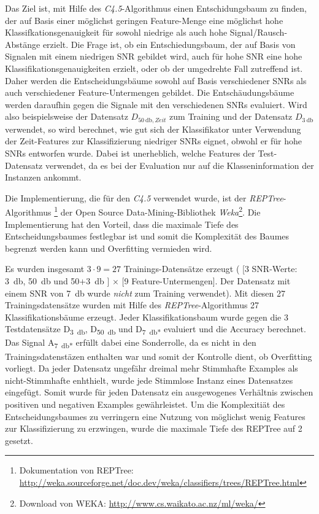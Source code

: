 Das Ziel ist, mit Hilfe des \emph{C4.5}-Algorithmus einen Entschidungsbaum zu finden, der auf Basis einer möglichst geringen Feature-Menge eine möglichst hohe Klassifkationsgenauigkeit für sowohl niedrige als auch hohe Signal/Rausch-Abstänge erzielt. Die Frage ist, ob ein Entschiedungsbaum, der auf Basis von Signalen mit einem niedrigen SNR gebildet wird, auch für hohe SNR eine hohe Klassifikationsgenauigkeiten erzielt, oder ob der umgedrehte Fall zutreffend ist. Daher werden die Entscheidungsbäume sowohl auf Basis verschiedener SNRs als auch verschiedener Feature-Untermengen gebildet. Die Entschäudungsbäume werden daraufhin gegen die Signale mit den verschiedenen SNRs evaluiert. Wird also beispielsweise der Datensatz $D_{\SI{50}{\decibel},Zeit}$ zum Training und der Datensatz $D_{\SI{3}{\decibel}}$ verwendet, so wird berechnet, wie gut sich der Klassifikator unter Verwendung der Zeit-Features zur Klassifizierung niedriger SNRs eignet, obwohl er für hohe SNRs entworfen wurde. Dabei ist unerheblich, welche Features der Test-Datensatz verwendet, da es bei der Evaluation nur auf die Klasseninformation der Instanzen ankommt.

Die Implementierung, die für den \emph{C4.5} verwendet wurde, ist der \emph{REPTree}-Algorithmus \footnote{Dokumentation von REPTree: \url{http://weka.sourceforge.net/doc.dev/weka/classifiers/trees/REPTree.html}} der Open Source Data-Mining-Bibliothek \emph{Weka}\footnote{Download von WEKA: \url{http://www.cs.waikato.ac.nz/ml/weka/}}. Die Implementierung hat den Vorteil, dass die maximale Tiefe des Entscheidungsbaumes festlegbar ist und somit die Komplexität des Baumes begrenzt werden kann und Overfitting vermieden wird.

Es wurden insgesamt $3 \cdot 9 = 27$ Trainings-Datensätze erzeugt ( [3 SNR-Werte: \SI{3}{\decibel}, \SI{50}{\decibel} und 50+\SI{3}{\decibel} ] $\times$ [9 Feature-Untermengen]. Der Datensatz mit einem SNR von \SI{7}{\decibel} wurde \emph{nicht} zum Training verwendet). Mit diesen 27 Trainingsdatensätze wurden mit Hilfe des \emph{REPTree}-Algorithmus 27 Klassifikationsbäume erzeugt. Jeder Klassifikationsbaum wurde gegen die 3 Testdatensätze D\textsubscript{\SI{3}{\decibel}}, D\textsubscript{\SI{50}{\decibel}} und D\textsubscript{\SI{7}{\decibel}*} evaluiert und die Accuracy berechnet. Das Signal A\textsubscript{\SI{7}{\decibel}*} erfüllt dabei eine Sonderrolle, da es nicht in den Trainingsdatenstäzen enthalten war und somit der Kontrolle dient, ob Overfitting vorliegt. Da jeder Datensatz ungefähr dreimal mehr Stimmhafte Examples als nicht-Stimmhafte enhthielt, wurde jede Stimmlose Instanz eines Datensatzes eingefügt. Somit wurde für jeden Datensatz  ein ausgewogenes Verhältnis zwischen positiven und negativen Examples gewährleistet. Um die Komplexitiät des Entscheidungsbaumes zu verringern eine Nutzung von möglichst wenig Features zur Klassifizierung zu erzwingen, wurde die maximale Tiefe des REPTree auf 2 gesetzt. 

